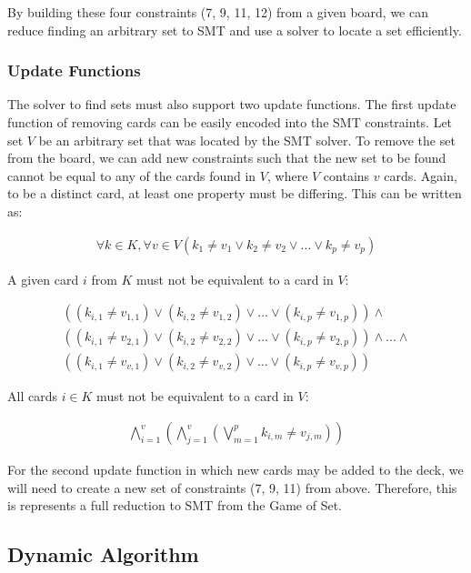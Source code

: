 \documentclass[pageno]{jpaper}
\begin{document}
By building these four constraints (7, 9, 11, 12) from a given board, we can reduce finding an arbitrary set to SMT and use a solver to locate a set efficiently. 

\subsubsection{Update Functions} 
The solver to find sets must also support two update functions. The first update function of removing cards can be easily encoded into the SMT constraints. Let set $V$ be an arbitrary set that was located by the SMT solver. To remove the set from the board, we can add new constraints such that the new set to be found cannot be equal to any of the cards found in $V$, where $V$ contains $v$ cards. Again, to be a distinct card, at least one property must be differing. This can be written as:

\begin{align}
	\forall k \in K, \forall v \in V \left (k_1 \neq v_1 \vee k_2 \neq v_2 \vee ... \vee k_p \neq v_p \right)
\end{align}

A given card $i$ from $K$ must not be equivalent to a card in $V$:

\begin{multline}
	((k_{i,1} \neq v_{1,1}) \vee (k_{i,2} \neq v_{1,2}) \vee ... \vee (k_{i,p} \neq v_{1,p})) \wedge \\
	 ((k_{i,1} \neq v_{2,1}) \vee (k_{i,2} \neq v_{2,2}) \vee ... \vee (k_{i,p} \neq v_{2,p}))  \wedge ... \wedge \\ ((k_{i,1} \neq v_{v,1}) \vee (k_{i,2} \neq v_{v,2}) \vee ... \vee (k_{i,p} \neq v_{v,p})) 
\end{multline}

All cards $i \in K$ must not be equivalent to a card in $V$:

\begin{align}
	\bigwedge \limits_{i=1}^{v}   \left( \bigwedge \limits_{j=1}^{v}  \left( \bigvee \limits_{m = 1}^{p} k_{i,m} \neq v_{j,m} \right)   \right)
\end{align}




For the second update function in which new cards may be added to the deck, we will need to create a new set of constraints (7, 9, 11) from above. Therefore, this is represents a full reduction to SMT from the Game of Set. 


\subsection{Dynamic Algorithm}
\end{document}
